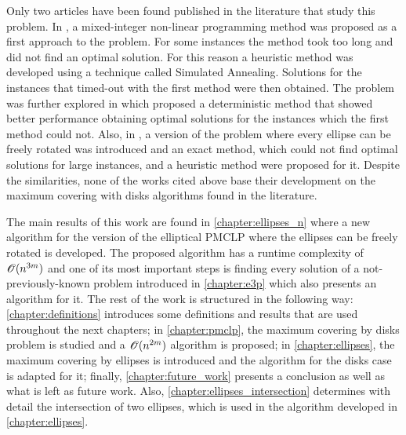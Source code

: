 Only two articles have been found published in the literature that study this problem. In , a mixed-integer non-linear programming method was proposed as a first approach to the problem. For some instances the method took too long and did not find an optimal solution. For this reason a heuristic method was developed using a technique called Simulated Annealing. Solutions for the instances that timed-out with the first method were then obtained. The problem was further explored in  which proposed a deterministic method that showed better performance obtaining optimal solutions for the instances which the first method could not. Also, in , a version of the problem where every ellipse can be freely rotated was introduced and an exact method, which could not find optimal solutions for large instances, and a heuristic method were proposed for it. Despite the similarities, none of the works cited above base their development on the maximum covering with disks algorithms found in the literature.

The main results of this work are found in \autoref{chapter:ellipses_n} where a new algorithm for the version of the elliptical PMCLP where the ellipses can be freely rotated is developed. The proposed algorithm has a runtime complexity of $\mathscr{O}(n^{3m})$ and one of its most important steps is finding every solution of a not-previously-known problem introduced in \autoref{chapter:e3p} which also presents an algorithm for it. The rest of the work is structured in the following way: \autoref{chapter:definitions} introduces some definitions and results that are used throughout the next chapters; in \autoref{chapter:pmclp}, the maximum covering by disks problem is studied and a $\mathscr{O}(n^{2m})$ algorithm is proposed; in \autoref{chapter:ellipses}, the maximum covering by ellipses is introduced and the algorithm for the disks case is adapted for it; finally, \autoref{chapter:future_work} presents a conclusion as well as what is left as future work. Also, \autoref{chapter:ellipses_intersection} determines with detail the intersection of two ellipses, which is used in the algorithm developed in \autoref{chapter:ellipses}.

